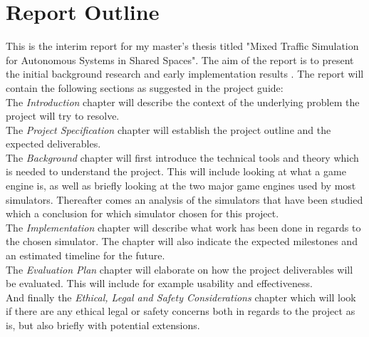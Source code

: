 \newcommand\tab[1][1cm]{\hspace*{#1}}

\section{Report Outline}
This is the interim report for my master's thesis titled "Mixed Traffic Simulation for Autonomous Systems in Shared Spaces". The aim of the report is to present the initial background research and early implementation results \cite{studentGuideline}. The report will contain the following sections as suggested in the project guide:
\\ \tab The \emph{Introduction} chapter will describe the context of the underlying problem the project will try to resolve.
\\ \tab The \emph{Project Specification} chapter will establish the project outline and the expected deliverables. 
\\ \tab The \emph{Background} chapter will first introduce the technical tools and theory which is needed to understand the project. This will include looking at what a game engine is, as well as briefly looking at the two major game engines used by most simulators. Thereafter comes an analysis of the simulators that have been studied which a conclusion for which simulator chosen for this project. 
\\ \tab The \emph{Implementation} chapter will describe what work has been done in regards to the chosen simulator. The chapter will also indicate the expected milestones and an estimated timeline for the future. 
\\ \tab The \emph{Evaluation Plan} chapter will elaborate on how the project deliverables will be evaluated. This will include for example usability and effectiveness. 
\\ \tab And finally the \emph{Ethical, Legal and Safety Considerations} chapter which will look if there are any ethical legal or safety concerns both in regards to the project as is, but also briefly with potential extensions. 

